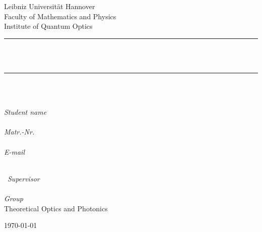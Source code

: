 \begin{titlepage}
\newcommand{\HRule}{\rule{\linewidth}{0.5mm}}
\center

{\sffamily\Huge Leibniz Universit\"at Hannover}\\[0.2cm]
{\sffamily\LARGE Faculty of Mathematics and Physics}\\
{\sffamily\LARGE Institute of Quantum Optics}
\vfill



\HRule\\[0.4cm]
{\huge\sffamily \myTitle}\\[0.4cm]
\HRule\\[1.5cm]
	
\\[1.5cm]

\vfill

\begin{minipage}[t]{0.45\textwidth}
    \begin{flushleft}
        \large
        \textit{Student name}\\
        {\sffamily \myName}\\[0.2cm]
        \textit{Matr.-Nr.}\\
        {\sffamily \myMatrNr}\\[0.2cm]
        \textit{E-mail}\\
        {\tt \myMailAddress}\\[0.2cm]
    \end{flushleft}
\end{minipage}
\hfill
\begin{minipage}[t]{0.45\textwidth}
    \begin{flushright}
        \large\
        \textit{Supervisor}\\
        {\sffamily \mySupervisor} \\[0.2cm] %
        \textit{Group}\\
        {\sffamily Theoretical Optics and Photonics}\\[0.1cm]
    \end{flushright}
\end{minipage}
	
\vfill\vfill\vfill %
{\large\sffamily \today} %
\vfill %
	
\end{titlepage}
